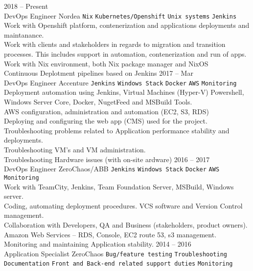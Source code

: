 \documentclass[9pt]{style/developercv}
\begin{document}
\begin{entrylist}
	\entry
	    {2018 -- Present\\\footnotesize{DevOps Engineer}}
		{Nordea}
		{
			\texttt{Nix}\slashsep
			\texttt{Kubernetes/Openshift}\slashsep
			\texttt{Unix systems}\slashsep
			\texttt{Jenkins}\\

			Work with Openshift platform, contenerization and applications deployments and maintanance. \\
			Work with clients and stakeholders in regards to migration and transition processes. This includes support in automation, contenerization and run of apps. \\
			Work with Nix environment, both Nix package manager and NixOS \\
			Continuous Deplotment pipelines based on Jenkins
		}
	\entry
		{2017 -- Mar\\\footnotesize{DevOps Engineer}}
		{Accenture}
		{
			\texttt{Jenkins}\slashsep
			\texttt{Windows Stack}\slashsep
			\texttt{Docker}\slashsep
			\texttt{AWS}\slashsep
			\texttt{Monitoring}\\
 
 			Deployment automation using Jenkins, Virtual Machines (Hyper-V) Powershell, Windows Server Core, Docker, NugetFeed and MSBuild Tools.\\ 
 			AWS configuration, administration and automation (EC2, S3, RDS)\\
 			Deploying and configuring the web app (CMS) used for the project.\\
			Troubleshooting problems related to Application performance stability and deployments.\\
			Troubleshooting VM's and VM administration.\\
			Troubleshooting Hardware issues (with on-site ardware)
		}
	\entry
		{2016 -- 2017\\\footnotesize{DevOps Engineer}}
		{ZeroChaos/ABB}
		{
			\texttt{Jenkins}\slashsep
			\texttt{Windows Stack}\slashsep
			\texttt{Docker}\slashsep
			\texttt{AWS}\slashsep
			\texttt{Monitoring}\\

			Work with TeamCity, Jenkins, Team Foundation Server, MSBuild, Windows server.\\
			Coding, automating deployment procedures. VCS software and Version Control management.\\
			Collaboration with Developers, QA and Business (stakeholders, product owners).\\
			Amazon Web Services – RDS, Console, EC2 route 53, s3 management.\\
			Monitoring and maintaining Application stability.
		}
	\entry
		{2014 -- 2016\\\footnotesize{Application Specialist}}
		{ZeroChaos}
		{
			\texttt{Bug/feature testing}\slashsep
			\texttt{Troubleshooting}\slashsep
			\texttt{Documentation}\slashsep
			\texttt{Front and Back-end related support duties}\slashsep
			\texttt{Monitoring}\\

}
\end{entrylist}
\end{document}
